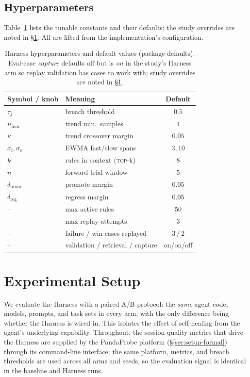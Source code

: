 \documentclass[letterpaper]{article} %
\newcommand{\dpromote}{\delta_{\mathrm{prom}}}
\newcommand{\dregress}{\delta_{\mathrm{reg}}}
\newcommand{\topk}{\textsc{top-}k}
\begin{document}
\subsection{Hyperparameters}
\label{sec:hyper}

Table~\ref{tab:hyper} lists the tunable constants and their defaults; the study overrides are
noted in \S\ref{sec:setup}. All are lifted from the implementation's configuration.

\begin{table}[t]
\centering\small
\caption{Harness hyperparameters and default values (package defaults). Eval-case \emph{capture}
defaults off but is \emph{on} in the study's Harness arm so replay validation has cases to work
with; study overrides are noted in \S\ref{sec:setup}.}
\label{tab:hyper}
\begin{tabular}{@{}llc@{}}
\toprule
Symbol / knob & Meaning & Default \\
\midrule
$\tau_j$ & breach threshold & $0.5$ \\
$n_{\min}$ & trend min.\ samples & $4$ \\
$\kappa$ & trend crossover margin & $0.05$ \\
$\sigma_{\mathrm{f}},\sigma_{\mathrm{s}}$ & EWMA fast/slow spans & $3,10$ \\
$k$ & rules in context (\topk) & $8$ \\
$n$ & forward-trial window & $5$ \\
$\dpromote$ & promote margin & $0.05$ \\
$\dregress$ & regress margin & $0.05$ \\
-- & max active rules & $50$ \\
-- & max replay attempts & $3$ \\
-- & failure / win cases replayed & $3\,/\,2$ \\
-- & validation / retrieval / capture & on/on/off \\
\bottomrule
\end{tabular}
\end{table}

\section{Experimental Setup}
\label{sec:setup}

We evaluate the Harness with a paired A/B protocol: the \emph{same} agent code, models,
prompts, and task sets in every arm, with the only difference being whether the Harness is
wired in. This isolates the effect of self-healing from the agent's underlying capability.
Throughout, the session-quality metrics that drive the Harness are supplied by the PandaProbe
platform (\S\ref{sec:setup-formal}) through its command-line interface; the same platform,
metrics, and breach thresholds are used across all arms and seeds, so the evaluation signal is
identical in the baseline and Harness runs.
\end{document}
